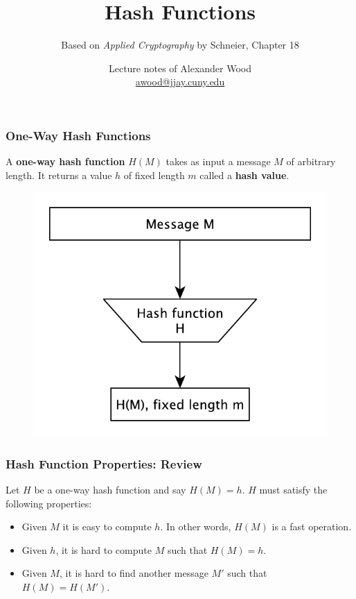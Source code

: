 \documentclass{beamer}
\title[HF]{Hash Functions}
\subtitle{Based on \emph{Applied Cryptography} by Schneier, Chapter 18}
\author
{Lecture notes of Alexander Wood \\ \scriptsize \href{mailto:awood@jjay.cuny.edu}{awood@jjay.cuny.edu}}
\institute[JJay]{John Jay College of Criminal Justice}
\date{}
\newcommand{\<}{\langle}
\renewcommand{\>}{\rangle}
\begin{document}

\begin{frame}
  \titlepage
\end{frame}


\begin{frame}
\frametitle{One-Way Hash Functions}

A \textbf{one-way hash function} $H(M)$ takes as input a message $M$ of arbitrary length. It returns a value $h$ of fixed length $m$ called a \textbf{hash value}.

\begin{figure}
\includegraphics[scale=.6]{IMG/hash.pdf}
\end{figure}
\end{frame}

\begin{frame}
\frametitle{Hash Function Properties: Review}

Let $H$ be a one-way hash function and say $H(M) = h$. $H$ must satisfy the following properties:
\begin{itemize}
\item Given $M$ it is easy to compute $h$. In other words, $H(M)$ is a fast operation.
\item Given $h$, it is hard to compute $M$ such that $H(M) = h$.
\item Given $M$, it is hard to find another message $M'$ such that $H(M) = H(M')$.
\end{itemize}
\end{frame}
\end{document}

